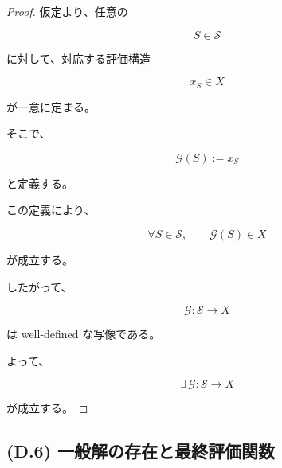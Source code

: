 \documentclass[a4paper,11pt]{article}
\newcommand{\Solver}{\mathcal{S}}
\begin{document}
\begin{proof}

仮定より、任意の

\begin{equation}
    S\in\Solver
\end{equation}

に対して、対応する評価構造

\begin{equation}
    x_S\in X
\end{equation}

が一意に定まる。

そこで、

\begin{equation}
    \mathcal{G}(S):=x_S
\end{equation}

と定義する。

この定義により、

\begin{equation}
    \forall S\in\Solver,
    \qquad
    \mathcal{G}(S)\in X
\end{equation}

が成立する。

したがって、

\begin{equation}
    \mathcal{G}:
    \Solver\to X
\end{equation}

は well-defined な写像である。

よって、

\begin{equation}
    \exists\,
    \mathcal{G}:
    \Solver\to X
\end{equation}

が成立する。
\end{proof}


\subsection{(D.6) 一般解の存在と最終評価関数}
\label{subsec:D6}
\end{document}
